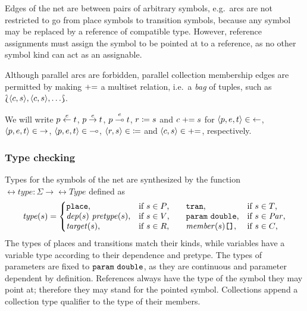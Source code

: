 Edges of the net are between pairs of arbitrary symbols, e.g.~arcs are not restricted to go from place symbols to transition symbols, because any symbol may be replaced by a reference of compatible type. However, reference assignments must assign the symbol to be pointed at to a reference, as no other symbol kind can act as an assignable.

Although parallel arcs are forbidden, parallel collection membership edges are permitted by making \({\mathrel{{+}{=}}}\) a multiset relation, i.e.~a \emph{bag} of tuples, such as \(\Lbag \langle c, s \rangle, \langle c, s \rangle, \ldots \Rbag\).

We will write \(p \overset{e}{\leftarrow} t\), \(p \overset{e}{\rightarrow} t\), \(p \overset{e}{\multimap} t\), \(r \coloneq s\) and \(c \mathrel{{+}{=}} s\) for \(\langle p, e, t \rangle \in {\leftarrow}\), \(\langle p, e, t \rangle \in {\rightarrow}\), \(\langle p, e, t \rangle \in {\multimap}\), \(\langle r, s \rangle \in {\coloneq}\) and \(\langle c, s \rangle \in {\mathrel{{+}{=}}}\), respectively.

\subsubsection{Type checking}

Types for the symbols of the net are synthesized by the function \(\rel{type}\colon \Sigma \to \rel{Type}\) defined as
\begin{equation}
  \rel{type}(s) = \left\{\begin{array}{@{}l@{\quad}l@{\qquad}l@{\quad}l@{}}
    \lit{place} \text, & \text{if \(s \in P\),}
    & \lit{tran} \text, & \text{if \(s \in T\),} \\
    \vartype{\rel{dep}(s)}{\rel{pretype}(s)} \text, & \text{if \(s \in V\),}
    & \vartype{\lit{param}}{\lit{double}} \text, & \text{if \(s \in \Par\),} \\
    \rel{target}(s) \text, & \text{if \(s \in R\),}
    & \bagtype{\rel{member}(s)} \text, & \text{if \(s \in C\),}
  \end{array}\right.
\end{equation}
The types of places and transitions match their kinds, while variables have a variable type according to their dependence and pretype. The types of parameters are fixed to \(\texttt{\upshape param}\ \texttt{\upshape double}\), as they are continuous and parameter dependent by definition. References always have the type of the symbol they may point at; therefore they may stand for the pointed symbol. Collections append a collection type qualifier to the type of their members.

